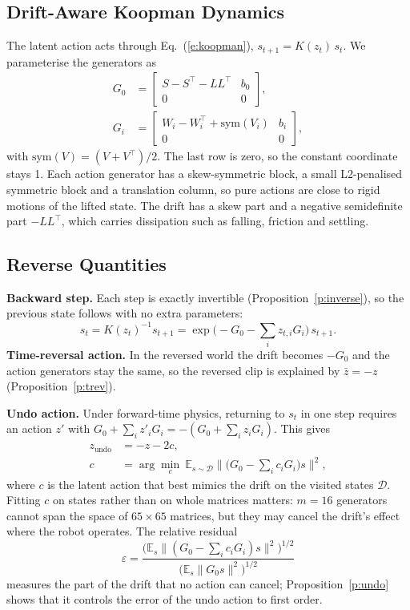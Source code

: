 \documentclass{jcse}
\newcommand{\zb}{\bar{z}}
\newcommand{\zundo}{z_{\mathrm{undo}}}
\newcommand{\sym}{\mathrm{sym}}
\begin{document}
\subsection{Drift-Aware Koopman Dynamics}
The latent action acts through Eq.~(\ref{e:koopman}), $s_{t+1}=K(z_t)\,s_t$.
We parameterise the generators as
\begin{align}
G_0&=\begin{bmatrix} S-S^\top-LL^\top & b_0\\ 0 & 0\end{bmatrix},\nonumber\\
G_i&=\begin{bmatrix} W_i-W_i^\top+\sym(V_i) & b_i\\ 0 & 0\end{bmatrix},
\label{e:gens}
\end{align}
with $\sym(V)=(V+V^\top)/2$.
The last row is zero, so the constant coordinate stays 1.
Each action generator has a skew-symmetric block, a small L2-penalised symmetric block and a translation column, so pure actions are close to rigid motions of the lifted state.
The drift has a skew part and a negative semidefinite part $-LL^\top$, which carries dissipation such as falling, friction and settling.

\subsection{Reverse Quantities}
\textbf{Backward step.} Each step is exactly invertible (Proposition~\ref{p:inverse}), so the previous state follows with no extra parameters:
\begin{equation}
s_t=K(z_t)^{-1}s_{t+1}=\exp\Big(-G_0-\sum_iz_{t,i}G_i\Big)\,s_{t+1}.
\label{e:backward}
\end{equation}
\textbf{Time-reversal action.} In the reversed world the drift becomes $-G_0$ and the action generators stay the same, so the reversed clip is explained by $\zb=-z$ (Proposition~\ref{p:trev}).

\textbf{Undo action.} Under forward-time physics, returning to $s_t$ in one step requires an action $z'$ with $G_0+\sum_iz'_iG_i=-(G_0+\sum_iz_iG_i)$. This gives
\begin{align}
\zundo&=-z-2c,\nonumber\\
c&=\arg\min_c\ \mathbb{E}_{s\sim\mathcal{D}}\Big\|\Big(G_0-\sum_ic_iG_i\Big)s\Big\|^2,
\label{e:undo}
\end{align}
where $c$ is the latent action that best mimics the drift on the visited states $\mathcal{D}$.
Fitting $c$ on states rather than on whole matrices matters: $m=16$ generators cannot span the space of $65\times65$ matrices, but they may cancel the drift's effect where the robot operates.
The relative residual
\begin{equation}
\varepsilon=\frac{\big(\mathbb{E}_s\|(G_0-\sum_ic_iG_i)s\|^2\big)^{1/2}}{\big(\mathbb{E}_s\|G_0s\|^2\big)^{1/2}}
\label{e:residual}
\end{equation}
measures the part of the drift that no action can cancel; Proposition~\ref{p:undo} shows that it controls the error of the undo action to first order.
\end{document}
